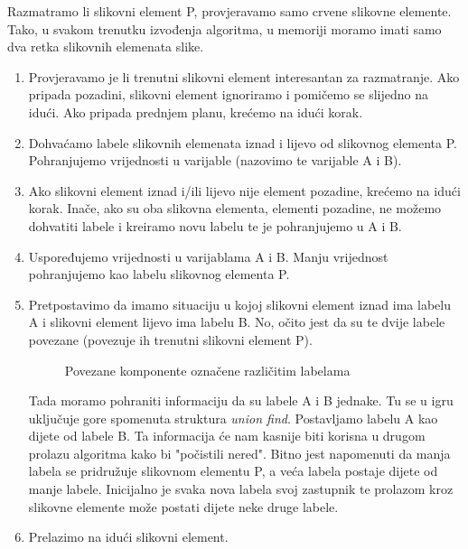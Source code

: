 \documentclass[times, utf8, diplomski]{fer}
\theoremstyle{definition}
\begin{document}
Razmatramo li slikovni element P, provjeravamo samo crvene slikovne elemente. Tako, u svakom trenutku izvođenja algoritma, u memoriji moramo imati samo dva retka slikovnih elemenata slike.
\begin{enumerate}
\item Provjeravamo je li trenutni slikovni element interesantan za razmatranje. Ako pripada pozadini, slikovni element ignoriramo i pomičemo se slijedno na idući. Ako pripada prednjem planu, krećemo na idući korak.
\item Dohvaćamo labele slikovnih elemenata iznad i lijevo od slikovnog elementa P. Pohranjujemo vrijednosti u varijable (nazovimo te varijable A i B).
\item Ako slikovni element iznad i/ili lijevo nije element pozadine, krećemo na idući korak. Inače, ako su oba slikovna elementa, elementi pozadine, ne možemo dohvatiti labele i kreiramo novu labelu te je pohranjujemo u A i B.
\item Uspoređujemo vrijednosti u varijablama A i B. Manju vrijednost pohranjujemo kao labelu slikovnog elementa P.
\item Pretpostavimo da imamo situaciju u kojoj slikovni element iznad ima labelu A i slikovni element lijevo ima labelu B. No, očito jest da su te dvije labele povezane (povezuje ih trenutni slikovni element P).
\begin{figure}[h]
\begin{center}
\end{center}
\caption{Povezane komponente označene različitim labelama}
\end{figure}
Tada moramo pohraniti informaciju da su labele A i B jednake. Tu se u igru uključuje gore spomenuta struktura \textit{union find}. Postavljamo labelu A kao dijete od labele B. Ta informacija će nam kasnije biti korisna u drugom prolazu algoritma kako bi "počistili nered". Bitno jest napomenuti da manja labela se pridružuje slikovnom elementu P, a veća labela postaje dijete od manje labele. Inicijalno je svaka nova labela svoj zastupnik te prolazom kroz slikovne elemente može postati dijete neke druge labele.
\item Prelazimo na idući slikovni element.
\end{enumerate}
\end{document}
